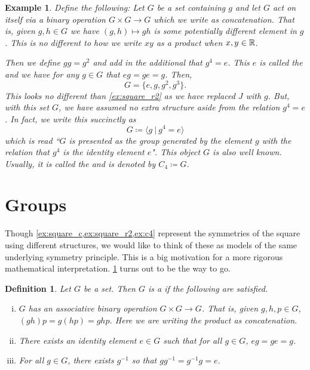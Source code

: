 \documentclass{article}
\theoremstyle{indented}
\newtheorem{definition}{Definition}
\newtheorem{example}{Example}
\begin{document}
\begin{example}
\label{ex:c4}
Define the following: Let $G$ be a set containing $g$ and let $G$ act on itself via a binary operation $G\times G \to G$ which we write as concatenation. That is, given $g,h\in G$ we have $(g,h)\mapsto gh$ is some potentially different element in $g$. This is no different to how we write $xy$ as a product when $x,y\in \mathbb{R}$.

Then we define $gg=g^2$ and add in the additional  that $g^4=e$. This $e$ is called the  and we have for any $g\in G$ that $eg=ge=g$. Then,
\[
G=\{e,g,g^2,g^3\}.
\]
This looks no different than \cref{ex:square_r2} as we have replaced $J$ with $g$. But, with this set $G$, we have assumed no extra structure aside from the relation $g^4=e$. In fact, we write this succinctly as
\[
G\coloneqq \langle g ~|~ g^4=e \rangle
\]
which is read ``$G$ is presented as the group generated by the element $g$ with the relation that $g^4$ is the identity element $e$". This object $G$ is also well known. Usually, it is called the  and is denoted by $C_4\coloneqq G$.
\end{example}

\section{Groups}

Though \cref{ex:square_c,ex:square_r2,ex:c4} represent the symmetries of the square using different structures, we would like to think of these as models of the same underlying symmetry principle. This is a big motivation for a more rigorous mathematical interpretation. \cref{ex:c4} turns out to be the way to go.

\begin{definition}
    Let $G$ be a set. Then $G$ is a  if the following are satisfied.
    \begin{enumerate}[i.]
        \item $G$ has an associative binary operation $G\times G \to G$. That is, given $g,h,p \in G$, $(gh)p = g(hp)= ghp$. Here we are writing the product as concatenation.
        \item There exists an identity element $e \in G$ such that for all $g\in G$, $eg=ge=g$.
        \item For all $g\in G$, there exists $g^{-1}$ so that $gg^{-1}=g^{-1}g = e$.
    \end{enumerate}
\end{definition}
\end{document}
